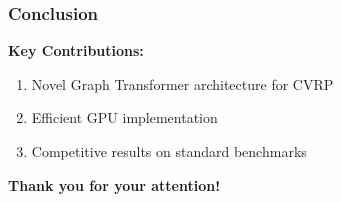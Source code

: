 \documentclass[aspectratio=169]{beamer}
\begin{document}
\begin{frame}
    \frametitle{Conclusion}
    
    \textbf{Key Contributions:}
    \begin{enumerate}
        \item Novel Graph Transformer architecture for CVRP
        \item Efficient GPU implementation
        \item Competitive results on standard benchmarks
    \end{enumerate}
    
    \bigskip
    
    \textbf{Thank you for your attention!}
    
    
\end{frame}
\end{document}
